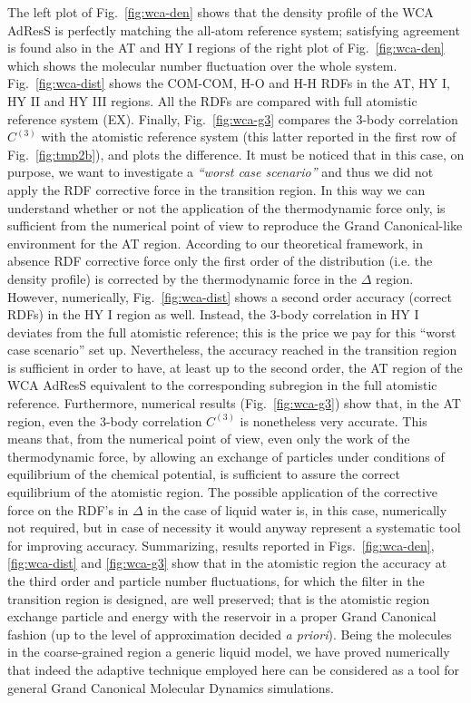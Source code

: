 \documentclass[aip,jcp,a4paper,reprint,onecolumn]{revtex4-1}
\newcommand{\HY}{{\Delta}}
\newcommand{\corr}{C^{(3)}}
\begin{document}
  The left plot of Fig.~\ref{fig:wca-den} shows that
  the density profile of the
  WCA AdResS is perfectly matching the all-atom reference system; satisfying agreement is found also in the AT and HY I regions of the right plot of Fig.~\ref{fig:wca-den} which shows the molecular
  number fluctuation over the whole system.
Fig.~\ref{fig:wca-dist} shows the COM-COM, H-O and H-H
    RDFs in the AT, HY I, HY II and HY III regions.
    All the RDFs are compared with full atomistic reference system (EX).
    Finally, Fig.~\ref{fig:wca-g3} compares the 3-body correlation $\corr$
    with the atomistic reference
    system (this latter reported in the first row of Fig.~\ref{fig:tmp2b}), and plots the difference. It must be noticed that in this case, on purpose, we want to investigate a {\it ``worst case scenario''} and thus we did not apply the RDF corrective force in the transition region. In this way we can understand whether or not the application of the thermodynamic force only, is sufficient from the numerical point of view to reproduce the Grand Canonical-like environment for the AT region.
    According to our theoretical framework, in absence RDF corrective force only the first order of the distribution (i.e. the density profile)
    is corrected by the thermodynamic force in the $\HY$ region.
    However, numerically, Fig.~\ref{fig:wca-dist} shows a second order accuracy (correct RDFs) in the HY I region as well. Instead, the 3-body
    correlation in HY I deviates from the full atomistic reference; this is the price we pay for this ``worst case scenario'' set up. Nevertheless, the accuracy reached in the transition region is sufficient in order to have, at least up to the second order, the AT region of the WCA AdResS equivalent to the corresponding subregion in the full atomistic reference.
    Furthermore, numerical results  (Fig.~\ref{fig:wca-g3}) show that, in the AT region, even the 3-body correlation $\corr$ is nonetheless very accurate. 
  This means that, from the numerical point of view, even only the work of the thermodynamic force, by allowing an exchange of particles under conditions of equilibrium of the chemical potential, is sufficient to assure the correct equilibrium of the atomistic region. The possible application of the corrective force on the RDF's in $\Delta$ in the case of liquid water is, in this case, numerically not required, but in case of necessity it would anyway represent a systematic tool for improving accuracy. 
  Summarizing, results reported in Figs.~\ref{fig:wca-den}, \ref{fig:wca-dist} and \ref{fig:wca-g3} show that in the atomistic region the accuracy at the third order and particle number fluctuations, for which the filter in the transition region is designed, are well preserved; that is the atomistic region exchange particle and energy with the reservoir in a proper Grand Canonical fashion (up to the level of approximation decided {\it a priori}). Being the molecules in the coarse-grained region a generic liquid model, we have proved numerically that indeed the adaptive technique employed here can be considered as a tool for general Grand Canonical Molecular Dynamics simulations. 
\end{document}
